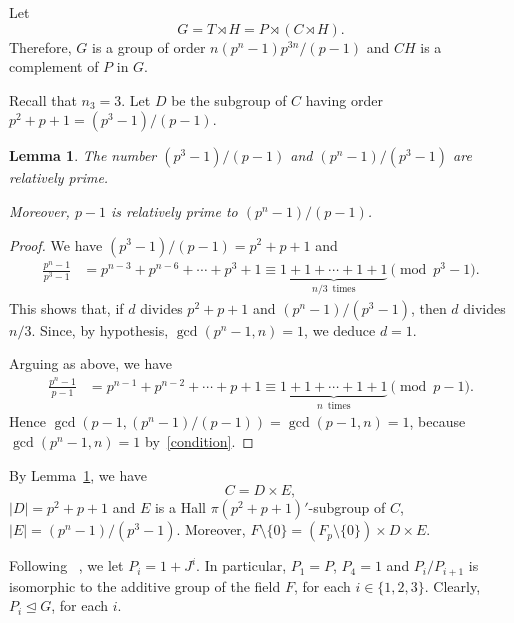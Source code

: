 \documentclass{amsart}
\newtheorem{lemma}[theorem]{Lemma}
\begin{document}
Let $$G=T\rtimes H=P\rtimes (C \rtimes H).$$ Therefore, $G$ is a group of order $n(p^n-1)p^{3n}/(p-1)$ and
$CH$ is a complement of $P$ in $G$.

Recall that $n_3 = 3$. Let $D$ be the  subgroup of $C$ having order $p^2+p+1=(p^3-1)/(p-1)$.
\begin{lemma}\label{yet:another}The number $(p^3-1)/(p-1)$ and $(p^n-1)/(p^3-1)$ are relatively prime.

Moreover, $p-1$ is relatively prime to $(p^n-1)/(p-1)$.
\end{lemma}
\begin{proof}We have $(p^3-1)/(p-1)=p^2+p+1$ and
\begin{align*}
\frac{p^n-1}{p^3-1}&=p^{n-3}+p^{n-6}+\cdots+p^3+1\equiv \underbrace{1+1+\cdots+1+1}_{n/3\, \textrm{ times}}\pmod{p^3-1}.
\end{align*}
This shows that, if $d$ divides $p^2+p+1$ and $(p^n-1)/(p^3-1)$, then $d$ divides $n/3$. Since, by hypothesis, $\gcd(p^n-1,n)=1$, we deduce $d=1$.

Arguing as above, we have
\begin{align*}
\frac{p^n-1}{p-1}&=p^{n-1}+p^{n-2}+\cdots+p+1\equiv \underbrace{1+1+\cdots+1+1}_{n\, \textrm{ times}}\pmod{p-1}.
\end{align*}
Hence $\gcd(p-1,(p^n-1)/(p-1)) = \gcd(p-1,n)=1$, because $\gcd(p^n-1,n)=1$ by~\eqref{condition}.
\end{proof}

By Lemma~\ref{yet:another}, we have $$C=D\times E,$$ $|D|=p^2+p+1$ and $E$ is a Hall $\pi(p^2+p+1)'$-subgroup of $C$, $|E|=(p^n-1)/(p^3-1)$. Moreover, $F\setminus\{0\}=(F_p\setminus\{0\})\times D \times E$.

Following~\cite{isaacs1} , we let $P_i=1+J^i$. In particular, $P_1=P$, $P_4=1$ and $P_i/P_{i+1}$ is isomorphic to the additive group of the field $F$, for each $i\in  \{1,2,3\}$. Clearly, $P_i\unlhd G$, for each $i$.
\end{document}
